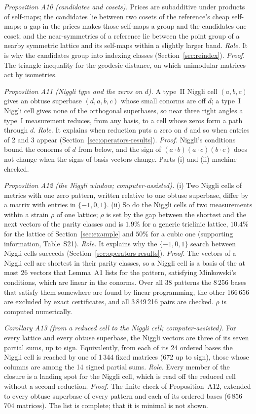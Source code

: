 \emph{Proposition A10 (candidates and cosets).} Prices are subadditive under products of self-maps; the candidates lie between two cosets of the reference's cheap self-maps; a gap in the prices makes those self-maps a group and the candidates one coset; and the near-symmetries of a reference lie between the point group of a nearby symmetric lattice and its self-maps within a slightly larger band. \emph{Role.} It is why the candidates group into indexing classes (Section~\ref{sec:reindex}). \emph{Proof.} The triangle inequality for the geodesic distance, on which unimodular matrices act by isometries.

\emph{Proposition A11 (Niggli type and the zeros on $d$).} A type~II Niggli cell $(a,b,c)$ gives an obtuse superbase $(d,a,b,c)$ whose small conorms are off $d$; a type~I Niggli cell gives none of the orthogonal superbases, so near three right angles a type~I measurement reduces, from any basis, to a cell whose zeros form a path through $d$. \emph{Role.} It explains when reduction puts a zero on $d$ and so when entries of 2 and 3 appear (Section~\ref{sec:operators-results}). \emph{Proof.} Niggli's conditions bound the conorms of $d$ from below, and the sign of $(a\cdot b)(a\cdot c)(b\cdot c)$ does not change when the signs of basis vectors change. Parts (i) and (ii) machine-checked.

\emph{Proposition A12 (the Niggli window; computer-assisted).} (i) Two Niggli cells of metrics with one zero pattern, written relative to one obtuse superbase, differ by a matrix with entries in $\{-1,0,1\}$. (ii) So do the Niggli cells of two measurements within a strain $\rho$ of one lattice; $\rho$ is set by the gap between the shortest and the next vectors of the parity classes and is $1.9\%$ for a generic triclinic lattice, $10.4\%$ for the lattice of Section~\ref{sec:example} and $50\%$ for a cubic one (supporting information, Table~S21). \emph{Role.} It explains why the $\{-1,0,1\}$ search between Niggli cells succeeds (Section~\ref{sec:operators-results}). \emph{Proof.} The vectors of a Niggli cell are shortest in their parity classes, so a Niggli cell is a basis of the at most 26 vectors that Lemma~A1 lists for the pattern, satisfying Minkowski's conditions, which are linear in the conorms. Over all 38 patterns the 8\,256 bases that satisfy them somewhere are found by linear programming, the other 166\,656 are excluded by exact certificates, and all 3\,849\,216 pairs are checked. $\rho$ is computed numerically.

\emph{Corollary A13 (from a reduced cell to the Niggli cell; computer-assisted).} For every lattice and every obtuse superbase, the Niggli vectors are three of its seven partial sums, up to sign. Equivalently, from each of its 24 ordered bases the Niggli cell is reached by one of 1\,344 fixed matrices (672 up to sign), those whose columns are among the 14 signed partial sums. \emph{Role.} Every member of the closure is a landing spot for the Niggli cell, which is read off the reduced cell without a second reduction. \emph{Proof.} The finite check of Proposition~A12, extended to every obtuse superbase of every pattern and each of its ordered bases (6\,856\,704 matrices). The list is complete; that it is minimal is not shown.


